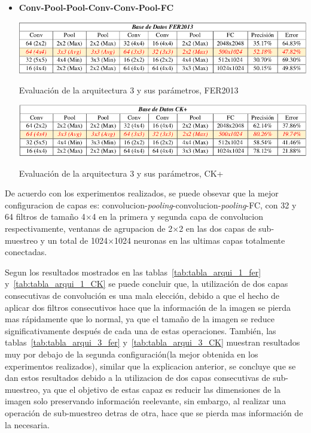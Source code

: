 \begin{itemize}
{}

\item {\textbf{Conv-Pool-Pool-Conv-Conv-Pool-FC}

\begin{table}[H]
    \centering
    \includegraphics[width=140mm]{Imagenes/tabla_arqui_3_fer.png} 
    \caption{Evaluación de la arquitectura 3 y sus parámetros, FER2013}
    \label{tab:tabla_arqui_3_fer}
\end{table}

\begin{table}[H]
    \centering
    \includegraphics[width=140mm]{Imagenes/tabla_arqui_3_CK.png}
    \caption{Evaluación de la arquitectura 3 y sus parámetros, CK+}
    \label{tab:tabla_arqui_3_CK}
\end{table}
}
\end{itemize}

De acuerdo con los experimentos realizados, se puede obsevar que la mejor configuracion de capas es: convolucion-\textit{pooling}-convolucion-\textit{pooling}-FC, con 32 y 64 filtros de tamaño 4$\times$4 en la primera y segunda capa de convolucion respectivamente, ventanas de agrupacion de 2$\times$2 en las dos capas de sub-muestreo y un total de 1024$\times$1024 neuronas en las ultimas capas totalmente conectadas.

Segun los resultados mostrados en las tablas~\ref{tab:tabla_arqui_1_fer} y~\ref{tab:tabla_arqui_1_CK} se puede concluir que, la utilización de dos capas consecutivas de convolución es una mala elección, debido a que el hecho de aplicar dos filtros consecutivos hace que la información de la imagen se pierda mas rápidamente que lo normal, ya que el tamaño de la imagen se reduce significativamente después de cada una de estas operaciones. También, las tablas~\ref{tab:tabla_arqui_3_fer} y~\ref{tab:tabla_arqui_3_CK} muestran resultados muy por debajo de la segunda configuración(la mejor obtenida en los experimentos realizados), similar que la explicacion anterior, se concluye que se dan estos resultados debido a la utilizacion de dos capas consecutivas de sub-muestreo, ya que el objetivo de estas capaz es reducir las dimensiones de la imagen solo preservando información reelevante, sin embargo, al realizar una operación de sub-muestreo detras de otra, hace que se pierda mas información de la necesaria. 

